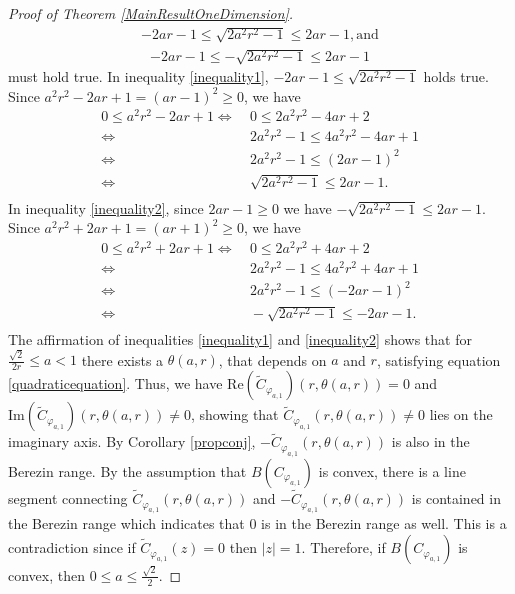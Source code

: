 \documentclass{amsart}
\theoremstyle{remark}
\begin{document}
\begin{proof}[Proof of Theorem \ref{MainResultOneDimension}]
\begin{align}
-2ar-1 \leq \sqrt{2a^2r^2-1} \leq 2ar-1, \text{and}    
\end{align}
\begin{align}\label{inequality2}
-2ar-1 \leq - \sqrt{2a^2r^2-1} \leq 2ar-1    
\end{align}
must hold true.
\noindent In inequality \eqref{inequality1}, $-2ar-1 \leq \sqrt{2a^2r^2-1}$ holds true. Since $a^2r^2-2ar+1=(ar-1)^2 \geq 0$, we have
\begin{align*}
0 \leq a^2r^2-2ar+1  \Leftrightarrow&\  0 \leq 2a^2r^2-4ar+2  \\
\Leftrightarrow&\ 2a^2r^2-1 \leq 4a^2r^2-4ar+1  \\
\Leftrightarrow&\ 2a^2r^2-1 \leq (2ar-1)^2 \\
\Leftrightarrow&\ \sqrt{2a^2r^2-1} \leq 2ar-1. \\
\end{align*}
In inequality \eqref{inequality2}, since $2ar-1 \geq 0$ we have $- \sqrt{2a^2r^2-1} \leq 2ar-1$. Since $a^2r^2+2ar+1=(ar+1)^2 \geq 0$, we have
\begin{align*}
0 \leq a^2r^2+2ar+1 \Leftrightarrow&\ 0 \leq 2a^2r^2+4ar+2 \\
\Leftrightarrow&\ 2a^2r^2-1 \leq 4a^2r^2+4ar+1  \\
\Leftrightarrow&\ 2a^2r^2-1 \leq (-2ar-1)^2  \\
\Leftrightarrow&\ -\sqrt{2a^2r^2-1} \leq -2ar-1. \\
\end{align*}
The affirmation of inequalities \eqref{inequality1} and \eqref{inequality2} shows that for $\frac{\sqrt{2}}{2r} \leq a < 1$ there exists a $\theta(a,r)$, that depends on $a$ and $r$, satisfying equation \eqref{quadraticequation}. Thus, we have $\mathrm{Re}(\widetilde{C}_{\varphi_{a,1}})(r,\theta(a,r))=0$ and $\mathrm{Im}(\widetilde{C}_{\varphi_{a,1}})(r,\theta(a,r)) \neq 0$, showing that
$\widetilde{C}_{{\varphi}_{a,1}}(r,\theta(a,r))\neq 0$ lies on the imaginary axis. By Corollary \ref{propconj}, $-\widetilde{C}_{{\varphi}_{a,1}}(r,\theta(a,r))$ is also in the Berezin range.  By the assumption that $B(C_{\varphi_{a,1}})$ is convex, there is a line segment connecting $\widetilde{C}_{{\varphi}_{a,1}}(r,\theta(a,r))$ and $-\widetilde{C}_{{\varphi}_{a,1}}(r,\theta(a,r))$ is contained in the Berezin range which indicates that $0$ is in the Berezin range as well. This is a contradiction since if $\widetilde{C}_{{\varphi}_{a,1}}(z)=0$ then $|z|=1$. Therefore, if $B(C_{\varphi_{a,1}})$ is convex, then $0 \leq a \leq \frac{\sqrt{2}}{2}$.


\end{proof}
\end{document}
